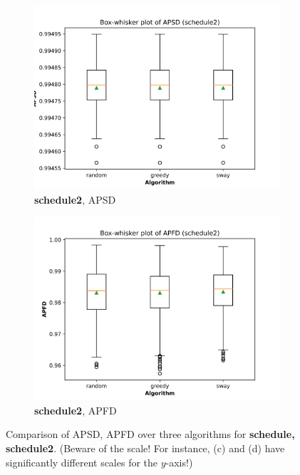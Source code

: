 \documentclass[10pt,journal,compsoc]{IEEEtran}
\begin{document}
\begin{figure}
		\begin{subfigure}[b]{0.4\linewidth}
			\centering
			\includegraphics[width=\textwidth]{figures/APSD_schedule2.png}
			\caption{{\bf schedule2}, APSD}
		\end{subfigure}
		\hfill
		\begin{subfigure}[b]{0.4\linewidth}
			\centering
			\includegraphics[width=\textwidth]{figures/APFD_schedule2.png}
			\caption{{\bf schedule2}, APFD}
		\end{subfigure}
		
		\caption{Comparison of APSD, APFD over three algorithms for {\bf schedule, schedule2}. (Beware of the scale! For instance, (c) and (d) have significantly different scales for the $y$-axis!)}
		\label{fig:main1}
	\end{figure}
	
\end{document}
